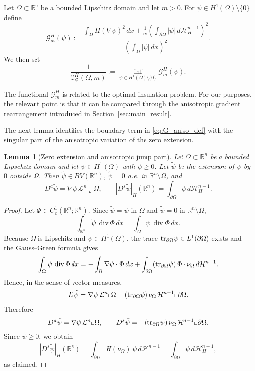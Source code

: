 \documentclass[oneside,a4paper,12pt,notitlepage]{article}
\newtheorem{lemma}[theorem]{Lemma}
\theoremstyle{definition}
\newcommand{\R}{\mathbb{R}}
\DeclareMathOperator{\divg}{div}
\newcommand{\tr}{{\rm tr}}
\begin{document}
Let $\Omega\subset\R^n$ be a bounded Lipschitz domain and let $m>0$. For
$\psi\in H^1(\Omega)\setminus\{0\}$ define
\begin{equation}\label{eq:G_aniso_def}
\mathcal G_m^H(\psi):=
\frac{\displaystyle \int_\Omega H(\nabla\psi)^2\,dx
+\frac1m\left(\int_{\partial\Omega}|\psi|\,d\mathcal H_H^{n-1}\right)^2}
{\left(\displaystyle \int_\Omega |\psi|\,dx\right)^2}.
\end{equation}
We then set
\begin{equation}\label{eq:TG_aniso_def}
\frac1{T_{\mathcal G}^H(\Omega,m)}
:=\inf_{\psi\in H^1(\Omega)\setminus\{0\}} \mathcal G_m^H(\psi).
\end{equation}

The functional $\mathcal G_m^H$ is related to the optimal insulation problem.
For our purposes, the relevant point is that it can be compared through the anisotropic
gradient rearrangement introduced in Section~\ref{sec:main_result}.

\medskip

The next lemma identifies the boundary term in \eqref{eq:G_aniso_def} with the singular
part of the anisotropic variation of the zero extension.

\begin{lemma}[Zero extension and anisotropic jump part]
\label{lem:zero_extension_jump}
Let $\Omega\subset\R^n$ be a bounded Lipschitz domain and let $\psi\in H^1(\Omega)$
with $\psi\ge 0$. Let $\tilde\psi$ be the extension of $\psi$ by $0$ outside $\Omega$.
Then $\tilde\psi\in BV(\R^n)$, $\tilde\psi=0$ a.e. in $\R^n\setminus\Omega$, and
\[
D^a\tilde\psi=\nabla\psi\,\mathcal L^n\llcorner\Omega,
\qquad
|D^s\tilde\psi|_H(\R^n)=\int_{\partial\Omega}\psi\,d\mathcal H_H^{n-1}.
\]
\end{lemma}

\begin{proof}
Let $\Phi\in C_c^1(\R^n;\R^n)$. Since $\tilde\psi=\psi$ in $\Omega$ and
$\tilde\psi=0$ in $\R^n\setminus\Omega$,
\[
\int_{\R^n}\tilde\psi\,\divg\Phi\,dx=\int_\Omega \psi\,\divg\Phi\,dx.
\]
Because $\Omega$ is Lipschitz and $\psi\in H^1(\Omega)$, the trace
$\tr_{\partial\Omega}\psi\in L^1(\partial\Omega)$ exists and the Gauss--Green formula gives
\[
\int_\Omega \psi\,\divg\Phi\,dx
=
-\int_\Omega \nabla\psi\cdot\Phi\,dx
+\int_{\partial\Omega}(\tr_{\partial\Omega}\psi)\,\Phi\cdot\nu_\Omega\,d\mathcal H^{n-1}.
\]
Hence, in the sense of vector measures,
\[
D\tilde\psi
=
\nabla\psi\,\mathcal L^n\llcorner\Omega
-(\tr_{\partial\Omega}\psi)\,\nu_\Omega\,\mathcal H^{n-1}\llcorner\partial\Omega.
\]
Therefore
\[
D^a\tilde\psi=\nabla\psi\,\mathcal L^n\llcorner\Omega,
\qquad
D^s\tilde\psi
=-(\tr_{\partial\Omega}\psi)\,\nu_\Omega\,\mathcal H^{n-1}\llcorner\partial\Omega.
\]
Since $\psi\ge 0$, we obtain
\[
|D^s\tilde\psi|_H(\R^n)
=
\int_{\partial\Omega}H(\nu_\Omega)\,\psi\,d\mathcal H^{n-1}
=
\int_{\partial\Omega}\psi\,d\mathcal H_H^{n-1},
\]
as claimed.
\end{proof}
\end{document}
